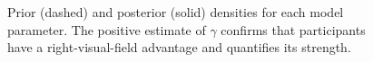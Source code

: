 \documentclass[doc,biblatex]{apa7}
\begin{document}
\begin{figure}
\vspace*{2pt}
\caption{Prior (dashed) and posterior (solid) densities for each model parameter. The positive estimate of $\gamma$ confirms that participants have a right-visual-field advantage and quantifies its strength.}
\label{fig06}
\end{figure}
\end{document}

